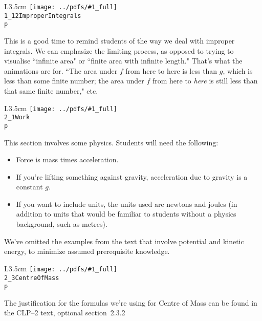 \documentclass{beamer}
\newcommand{\notefig}[3]{%
	\begin{wrapfigure}{L}{3.5cm}
	\texttt{[image: ../pdfs/\#1\_full]}\\
	\footnotesize
	\texttt{#2}\\
	 \texttt{p \pageref{#3}}
	\end{wrapfigure}
	}
\begin{document}
\begin{frame}
\notefig{1_12ImproperIntegrals}{1\_12Improper\linebreak Integrals}{note1.12a}
This is a good time to remind students of the way we deal with improper integrals. We can emphasize the limiting process, as opposed to trying to visualise ``infinite area" or ``finite area with infinite length." That's what the animations are for. ``The area under $f$ from here to here is less than $g$, which is less than some finite number; the area under $f$ from here to \textit{here} is still less than that same finite number," etc.
\end{frame}
\begin{frame}
\notefig{2_1Work}{2\_1Work}{note2.1a}
This section involves some physics. Students will need the following:
\begin{itemize}
\item Force is mass times acceleration.
\item If you're lifting something against gravity, acceleration due to gravity is a constant $g$.
\item If you want to include units, the units used are newtons and joules (in addition to units that would be familiar to students without a physics background, such as metres).
\end{itemize}
We've omitted the examples from the text that involve potential and kinetic energy, to minimize assumed prerequisite knowledge. 

\end{frame}
\begin{frame}
\notefig{2_3CentreOfMass}{2\_3CentreOfMass}{note2.3a}
The justification for the formulas we're using for Centre of Mass can be found in the CLP--2 text, optional section~2.3.2

\end{frame}
\end{document}
